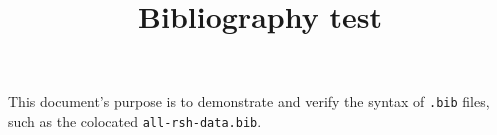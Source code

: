 \documentclass{IEEEtran}
\title{Bibliography test}
\begin{document}
\maketitle
This document's purpose is to demonstrate and verify the syntax of \verb|.bib| files,
such as the colocated \verb|all-rsh-data.bib|.

\nocite{*}

\end{document}

